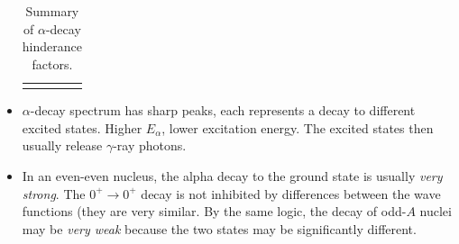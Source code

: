 \documentclass[letter]{article}
\begin{document}
\begin{itemize}
\begin{table}[hbt]
\begin{tabular}{llll}
                 &                                &                        &               
\end{tabular}
\caption{Summary of $\alpha$-decay hinderance factors.}
\label{tab:alpha-hinderance}
\end{table}
\item $\alpha$-decay spectrum has sharp peaks, each represents a decay
  to different excited states. Higher $E_\alpha$, lower excitation
  energy. The excited states then usually release $\gamma$-ray
  photons.~\cite[pp. 262-264]{krane}
\item In an even-even nucleus, the alpha decay to the ground state is
  usually \textit{very strong}. The $0^+ \to 0^+$ decay is not
  inhibited by differences between the wave functions (they are very
  similar. By the same logic, the decay of odd-$A$ nuclei may be
  \textit{very weak} because the two states may be significantly
  different.~\cite[pp.264]{krane}
\end{itemize}
\end{document}
